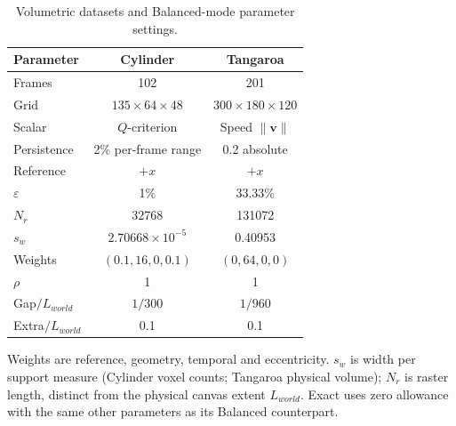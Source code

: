 \begin{table}[!tb]
\centering
\caption{Volumetric datasets and Balanced-mode parameter settings.}
\label{tab:volume-parameters}
\footnotesize
\setlength{\tabcolsep}{2pt}
\renewcommand{\arraystretch}{0.95}
\begin{tabular}{@{}lcc@{}}
\toprule
Parameter & Cylinder & Tangaroa \\
\midrule
Frames & 102 & 201 \\
Grid & $135\times64\times48$ & $300\times180\times120$ \\
Scalar & $Q$-criterion & Speed $\|\mathbf{v}\|$ \\
Persistence & 2\% per-frame range & 0.2 absolute \\
Reference & $+x$ & $+x$ \\
$\varepsilon$ & 1\% & 33.33\% \\
$N_r$ & 32768 & 131072 \\
$s_w$ & $2.70668\times10^{-5}$ & 0.40953 \\
Weights & $(0.1,16,0,0.1)$ & $(0,64,0,0)$ \\
$\rho$ & 1 & 1 \\
Gap$/L_{world}$ & $1/300$ & $1/960$ \\
Extra$/L_{world}$ & 0.1 & 0.1 \\
\bottomrule
\end{tabular}
\vspace{2pt}
\begin{minipage}{0.94\columnwidth}\footnotesize Weights are reference, geometry, temporal and eccentricity. $s_w$ is width per support measure (Cylinder voxel counts; Tangaroa physical volume); $N_r$ is raster length, distinct from the physical canvas extent $L_{world}$. Exact uses zero allowance with the same other parameters as its Balanced counterpart.\end{minipage}
\end{table}
